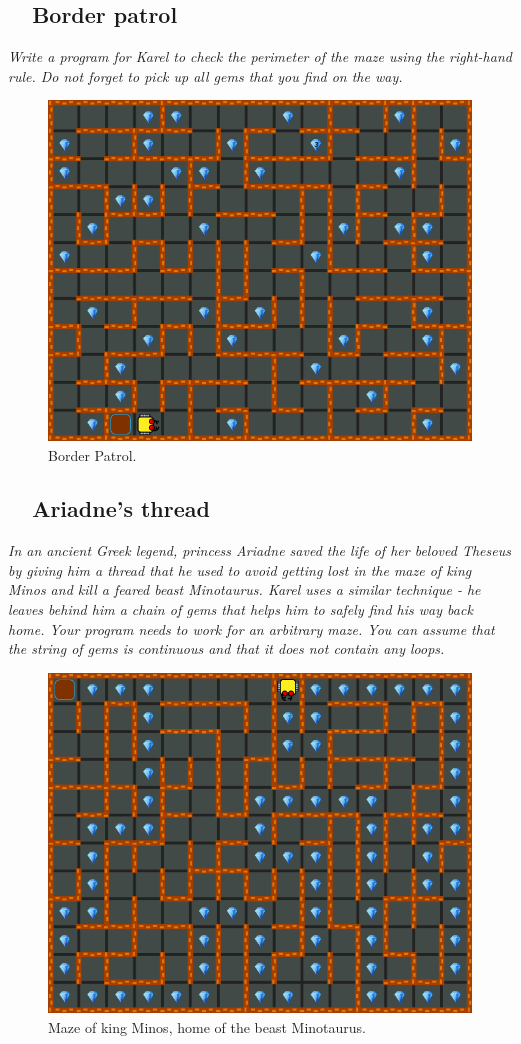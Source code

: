 {{\subsection{\ \ Border patrol}

{\em Write a program for Karel to check the perimeter of the maze using the 
right-hand rule. Do not forget to pick up all gems that you find on the way.}

\begin{figure}[!ht]
\begin{center}
\includegraphics[height=0.4\textwidth]{img/f13.png}
\end{center}
\vspace{-4mm}
\caption{Border Patrol.}
\label{fig:f13}
\end{figure}



\subsection{\ \ Ariadne's thread}

{\em In an ancient Greek legend, princess Ariadne saved the life of her 
beloved Theseus by giving him a thread that he used to avoid getting lost 
in the maze of king Minos and kill a feared beast Minotaurus. Karel uses 
a similar technique - he leaves behind him a chain of gems that helps him 
to safely find his way back home. Your program needs to work for an 
arbitrary maze. You can assume that the string of gems is continuous 
and that it does not contain any loops.}

\newpage

\begin{figure}[!ht]
\begin{center}
\includegraphics[height=0.4\textwidth]{img/f14.png}
\end{center}
\vspace{-4mm}
\caption{Maze of king Minos, home of the beast Minotaurus.}
\label{fig:f14}
\end{figure}

}}
